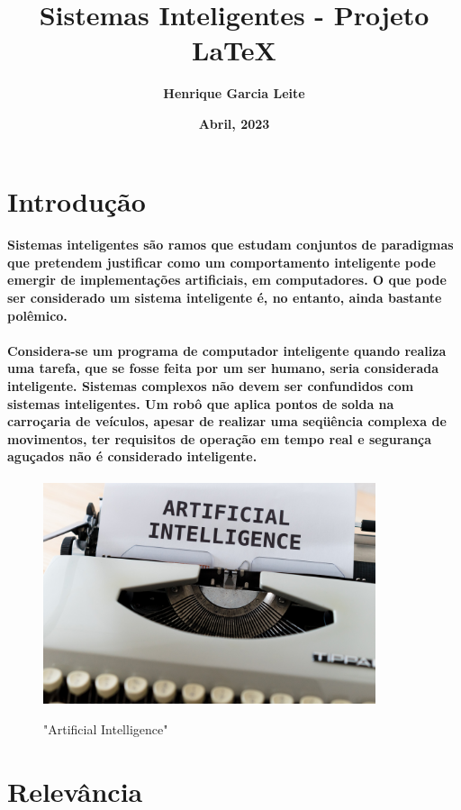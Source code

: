 \documentclass{article}
\title{\textsf{\textbf{Sistemas Inteligentes - Projeto LaTeX}}}
\author{\textsf{\textbf{Henrique Garcia Leite}}}
\date{\textsf{\textbf{Abril, 2023}}}
\begin{document}
\maketitle

\section{\textsf{Introdução}}

\paragraph{Sistemas inteligentes são ramos que estudam conjuntos de paradigmas que pretendem justificar como um comportamento inteligente pode emergir de implementações artificiais, em computadores. O que pode ser considerado um sistema inteligente é, no entanto, ainda bastante polêmico.}

\paragraph{Considera-se um programa de computador inteligente
quando realiza uma tarefa, que se fosse feita por um ser humano, seria considerada inteligente.
Sistemas complexos não devem ser confundidos com sistemas inteligentes. Um robô que aplica pontos de solda na carroçaria de veículos, apesar de realizar uma seqüência complexa de movimentos, ter requisitos de operação em tempo real e segurança aguçados não é
considerado inteligente.}

\begin{figure}[h!]
    \centering
    \includegraphics[width=\textwidth, height=6.5cm]{artificial-intelligence.jpg}
    \caption{"Artificial Intelligence"}\cite{IMAGE1}
    \label{fig:my_label}
\end{figure}

\section{\textsf{Relevância}}
\end{document}

